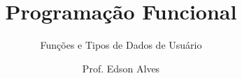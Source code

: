 \title{Programação Funcional}
\subtitle{Funções e Tipos de Dados de Usuário}
\date{}
\author{Prof. Edson Alves}
